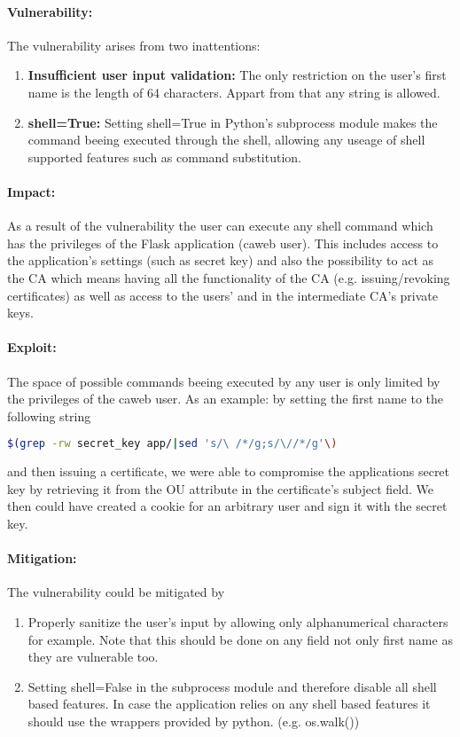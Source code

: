 \documentclass[english]{article}
\begin{document}
 \paragraph{Vulnerability:}
 The vulnerability arises from two inattentions:
\begin{enumerate}
\item \textbf{Insufficient user input validation:} The only restriction on the user's first name is the length of 64 characters. Appart from that any string is allowed.
\item \textbf{shell=True:} Setting shell=True in Python's subprocess module makes the command beeing executed through the shell, allowing any useage of shell supported features such as command substitution. 
\end{enumerate}

\paragraph{Impact:} As a result of the vulnerability the user can execute any shell command which has the privileges of the Flask application (caweb user). This includes access to the application's settings (such as secret key) and also the possibility to act as the CA which means having all the functionality of the CA (e.g. issuing/revoking certificates) as well as access to the users' and in the intermediate CA's private keys.

\paragraph{Exploit:}
The space of possible commands beeing executed by any user is only limited by the privileges of the caweb user. As an example: by setting the first name to the following string 
\begin{lstlisting}[language=bash]
$(grep -rw secret_key app/|sed 's/\ /*/g;s/\//*/g'\)
\end{lstlisting}
and then issuing a certificate, we were able to compromise the applications secret key by retrieving it from the OU attribute in the certificate's subject field. We then could have created a cookie for an arbitrary user and sign it with the secret key. 

\paragraph{Mitigation:} The vulnerability could be mitigated by
\begin{enumerate}
\item Properly sanitize the user's input by allowing only alphanumerical characters for example. Note that this should be done on any field not only first name as they are vulnerable too. 
\item Setting shell=False in the subprocess module and therefore disable all shell based features. In case the application relies on any shell based features it should use the wrappers provided by python. (e.g. os.walk())
\end{enumerate}
\end{document}
